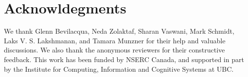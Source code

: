 \section*{Acknowldegments}
We thank  Glenn Bevilacqua,  Neda Zolaktaf,  Sharan Vaswani, Mark Schmidt, Laks V. S. Lakshmanan, and Tamara Munzner  for their help and valuable discussions. We also thank  the anonymous reviewers for their constructive feedback. This work has been funded by NSERC Canada,  and supported in part by the Institute for Computing, Information and Cognitive Systems at UBC. 